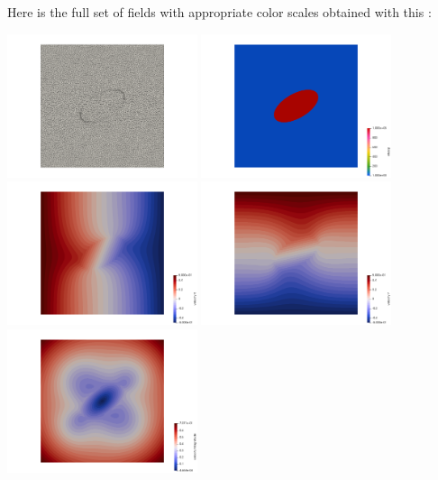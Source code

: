 Here is the full set of fields with appropriate color scales obtained with 
this \stone:
\begin{center}
\includegraphics[width=5.57cm]{python_codes/fieldstone_142/results/case2/mesh}
\includegraphics[width=5.57cm]{python_codes/fieldstone_142/results/case2/eta}\\
\includegraphics[width=5.57cm]{python_codes/fieldstone_142/results/case2/u}
\includegraphics[width=5.57cm]{python_codes/fieldstone_142/results/case2/v}
\includegraphics[width=5.57cm]{python_codes/fieldstone_142/results/case2/vel}\\

\end{center}

